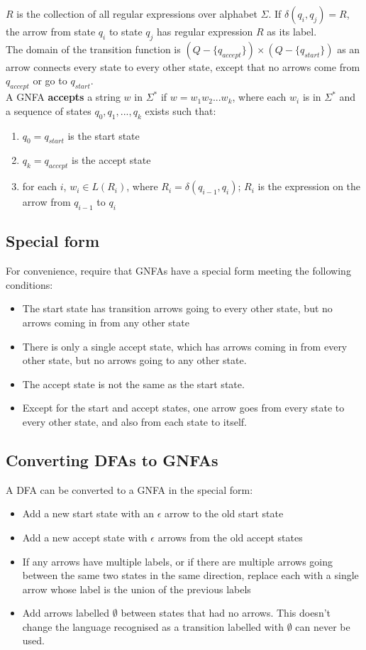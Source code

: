 \documentclass{article}
\begin{document}
$R$ is the collection of all regular expressions over alphabet $\Sigma$. If $\delta(q_i, q_j) = R$, the arrow from state $q_i$ to state $q_j$ has regular expression $R$ as its label.\medskip
\\ The domain of the transition function is $(Q - \{q_{accept}\}) \times (Q - \{q_{start}\})$ as an arrow connects every state to every other state, except that no arrows come from $q_{accept}$ or go to $q_{start}$.\medskip
\\A GNFA \textbf{accepts} a string $w$ in $\Sigma^*$ if $w = w_1w_2...w_k$, where each $w_i$ is in $\Sigma^*$ and a sequence of states $q_0, q_1, ..., q_k$ exists such that:
\begin{enumerate}
	\item $q_0 = q_{start}$ is the start state
	\item $q_k = q_{accept}$ is the accept state
	\item for each $i$, $w_i \in L(R_i)$, where $R_i = \delta(q_{i-1}, q_i)$; $R_i$ is the expression on the arrow from $q_{i-1}$ to $q_i$
\end{enumerate}

\subsection{Special form}
For convenience, require that GNFAs have a special form meeting the following conditions:
\begin{itemize}
	\item The start state has transition arrows going to every other state, but no arrows coming in from any other state
	\item There is only a single accept state, which has arrows coming in from every other state, but no arrows going to any other state.
	\item The accept state is not the same as the start state.
	\item Except for the start and accept states, one arrow goes from every state to every other state, and also from each state to itself.
\end{itemize}

\subsection{Converting DFAs to GNFAs}
A DFA can be converted to a GNFA in the special form:
\begin{itemize}
	\item Add a new start state with an $\epsilon$ arrow to the old start state
	\item Add a new accept state with $\epsilon$ arrows from the old accept states
	\item If any arrows have multiple labels, or if there are multiple arrows going between the same two states in the same direction, replace each with a single arrow whose label is the union of the previous labels
	\item Add arrows labelled $\emptyset$ between states that had no arrows. This doesn't change the language recognised as a transition labelled with $\emptyset$ can never be used.
\end{itemize}
\end{document}
